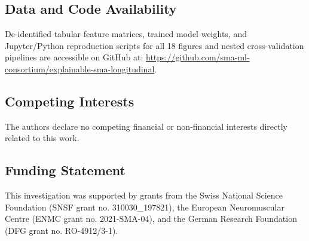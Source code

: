 \documentclass[journal]{IEEEtran}
\begin{document}
\subsection*{Data and Code Availability}
De-identified tabular feature matrices, trained model weights, and Jupyter/Python reproduction scripts for all 18 figures and nested cross-validation pipelines are accessible on GitHub at: \url{https://github.com/sma-ml-consortium/explainable-sma-longitudinal}.

\subsection*{Competing Interests}
The authors declare no competing financial or non-financial interests directly related to this work.

\subsection*{Funding Statement}
This investigation was supported by grants from the Swiss National Science Foundation (SNSF grant no. 310030\_197821), the European Neuromuscular Centre (ENMC grant no. 2021-SMA-04), and the German Research Foundation (DFG grant no. RO-4912/3-1).
\end{document}
